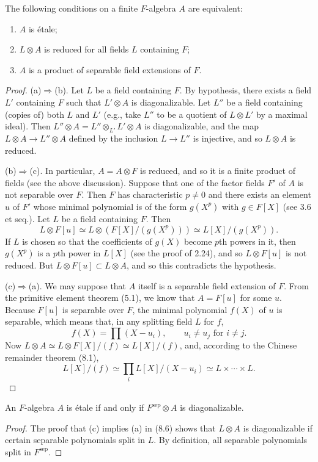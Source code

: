 \begin{proposition}[8.6]
The following conditions on a finite $F$-algebra $A$ are equivalent:
\begin{enumerate}[label=(\alph*)]
\item $A$ is \'etale;
\item $L\otimes A$ is reduced for all fields $L$ containing $F$;
\item $A$ is a product of separable field extensions of $F$.
\end{enumerate}
\end{proposition}
\begin{proof}
(a)$\Rightarrow$(b). Let $L$ be a field containing $F$. By hypothesis, there exists a field $L'$ containing $F$ such that $L'\otimes A$ is diagonalizable. Let $L''$ be a field containing (copies of) both $L$ and $L'$ (e.g., take $L''$ to be a quotient of $L\otimes L'$ by a maximal ideal). Then $L''\otimes A=L''\otimes_{L'}L'\otimes A$ is diagonalizable, and the map $L\otimes A\to L''\otimes A$ defined by the inclusion $L\to L''$ is injective, and so $L\otimes A$ is reduced.

(b)$\Rightarrow$(c). In particular, $A=A\otimes F$ is reduced, and so it is a finite product of fields (see the above discussion). Suppose that one of the factor fields $F'$ of $A$ is not separable over $F$. Then $F$ has characteristic $p\ne0$ and there exists an element $u$ of $F'$ whose minimal polynomial is of the form $g(X^p)$ with $g\in F[X]$ (see 3.6 et seq.). Let $L$ be a field containing $F$. Then
\[L\otimes F[u]\simeq L\otimes(F[X]/(g(X^p)))\simeq L[X]/(g(X^p)).\]
If $L$ is chosen so that the coefficients of $g(X)$ become $p$th powers in it, then $g(X^p)$ is a $p$th power in $L[X]$ (see the proof of 2.24), and so $L\otimes F[u]$ is not reduced. But $L\otimes F[u]\subset L\otimes A$, and so this contradicts the hypothesis.

(c)$\Rightarrow$(a). We may suppose that $A$ itself is a separable field extension of $F$. From the primitive element theorem (5.1), we know that $A=F[u]$ for some $u$. Because $F[u]$ is separable over $F$, the minimal polynomial $f(X)$ of $u$ is separable, which means that, in any splitting field $L$ for $f$,
\[f(X)=\prod(X-u_i),\qquad u_i\ne u_j\text{ for }i\ne j.\]
Now $L\otimes A\simeq L\otimes F[X]/(f)\simeq L[X]/(f)$, and, according to the Chinese remainder theorem (8.1),
\[L[X]/(f)\simeq\prod_i L[X]/(X-u_i)\simeq L\times\cdots\times L.\]
\end{proof}
\begin{corollary}[8.7]
An $F$-algebra $A$ is \'etale if and only if $F^{\mathrm{sep}}\otimes A$ is diagonalizable.
\end{corollary}
\begin{proof}
The proof that (c) implies (a) in (8.6) shows that $L\otimes A$ is diagonalizable if certain separable polynomials split in $L$. By definition, all separable polynomials split in $F^{\mathrm{sep}}$.
\end{proof}

